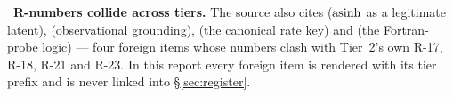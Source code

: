 \begin{warn}
\warnglyph{}~\textbf{R-numbers collide across tiers.} The source also cites
 ($\operatorname{asinh}$ as a legitimate latent), 
(observational grounding),  (the canonical rate key) and
 (the Fortran-probe logic) --- four foreign items whose
numbers clash with Tier~2's own R-17, R-18, R-21 and R-23. In this report every
foreign item is rendered with its tier prefix and is never linked into
\S\ref{sec:register}.
\end{warn}
